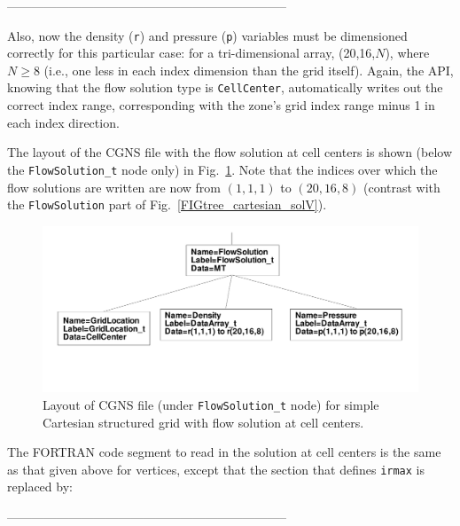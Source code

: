 \documentclass[12pt]{article}
\begin{document}
--------------------------------------------------------------------

\noindent Also, now the density ({\tt r}) and pressure
({\tt p}) variables must be dimensioned
correctly for this particular case:  for a tri-dimensional array,
(20,16,$N$), where $N \geq 8$
(i.e., one less in each index dimension than the grid itself).
Again, the API, knowing that the flow solution type is
{\tt CellCenter}, automatically writes out the correct index
range, corresponding with the zone's grid index range minus 1 in
each index direction.

The layout of the CGNS file with the flow
solution at cell centers is shown (below the
{\tt FlowSolution\_t} node only) in Fig.~\ref{FIGtree_cartesian_solC}.
Note that the indices over which the flow solutions are written
are now from $(1,1,1)$ to $(20,16,8)$ (contrast with 
the {\tt FlowSolution} part of Fig.~\ref{FIGtree_cartesian_solV}).

\begin{figure}[hpbt]
\centerline{{\includegraphics[width=150mm]{figures/tree_cartesian_solC}}}
\caption{Layout of CGNS file (under {\tt FlowSolution\_t} node)
for simple Cartesian structured grid with flow solution at cell
centers.}
\label{FIGtree_cartesian_solC}
\end{figure}
%

The FORTRAN code segment to read in the solution at cell centers
is the same as that given above for vertices, except that the section that
defines {\tt irmax} is replaced by:

--------------------------------------------------------------------
\end{document}
